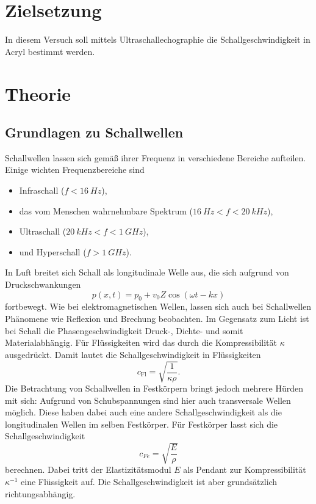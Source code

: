 \section*{Zielsetzung}
\label{sec:Zielsetzung}
In diesem Versuch soll mittels Ultraschallechographie die Schallgeschwindigkeit in Acryl bestimmt werden.

\section{Theorie}
\label{sec:Theorie}

\subsection{Grundlagen zu Schallwellen}
\label{sec:GrundlagenSchallwellen}

Schallwellen lassen sich gemäß ihrer Frequenz in verschiedene Bereiche aufteilen. Einige wichten 
Frequenzbereiche sind
\begin{itemize}
	\item Infraschall ($f < \SI{16}{Hz}$),
	\item das vom Menschen wahrnehmbare Spektrum ($\SI{16}{Hz} < f < \SI{20}{kHz}$),
	\item Ultraschall ($\SI{20}{kHz} < f < \SI{1}{GHz}$),
	\item und Hyperschall ($f > \SI{1}{GHz}$).
\end{itemize}
In Luft breitet sich Schall als longitudinale Welle aus, die sich aufgrund von Druckschwankungen
\begin{equation}
	p(x,t) = p_0 + v_0 Z \cos(\omega t - kx)
\end{equation}
fortbewegt. 
Wie bei elektromagnetischen Wellen, lassen sich auch bei Schallwellen Phänomene wie Reflexion und Brechung
beobachten. Im Gegensatz zum Licht ist bei Schall die Phasengeschwindigkeit Druck-, Dichte- und somit
Materialabhängig. Für Flüssigkeiten wird das durch die Kompressibilität $\kappa$ ausgedrückt.
Damit lautet die Schallgeschwindigkeit in Flüssigkeiten
\begin{equation}
	\label{eqn:c_fl}
	c_\text{Fl} = \sqrt{\frac{1}{\kappa \rho}}.
\end{equation}
Die Betrachtung von Schallwellen in Festkörpern bringt jedoch mehrere Hürden mit sich: Aufgrund von
Schubspannungen sind hier auch transversale Wellen möglich. Diese haben dabei auch eine andere Schallgeschwindigkeit
als die longitudinalen Wellen im selben Festkörper. Für Festkörper lasst sich die Schallgeschwindigkeit
\begin{equation}
	\label{eqn:c_fe}
	c_{Fe} = \sqrt{\frac{E}{\rho}}
\end{equation}
berechnen. Dabei tritt der Elastizitätsmodul $E$ als Pendant zur Kompressibilität $\kappa^{-1}$ eine Flüssigkeit
auf. Die Schallgeschwindigkeit ist aber grundsätzlich richtungsabhängig.

